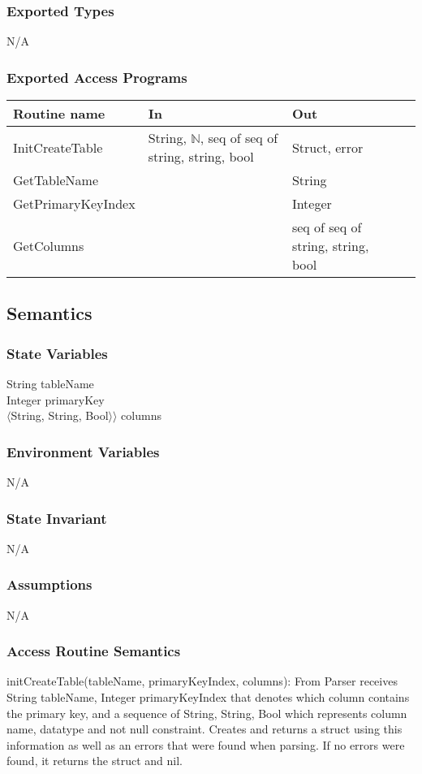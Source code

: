 \documentclass[12pt]{article}
\begin{document}
\subsubsection{Exported Types}
N/A
\subsubsection{Exported Access Programs}
\begin{tabular}{| l | l | l | l |}
\hline
\textbf{Routine name} & \textbf{In} & \textbf{Out}\\
\hline
InitCreateTable & String, $\mathbb{N}$, seq of seq of string, string, bool & Struct, error \\
\hline
GetTableName & & String \\
\hline
GetPrimaryKeyIndex & & Integer \\
\hline
GetColumns & & seq of seq of string, string, bool \\
\hline
\end{tabular}

\subsection{Semantics}
\subsubsection{State Variables}
String tableName \\
Integer primaryKey \\
$\langle$String, String, Bool$\rangle \rangle$ columns\\

\subsubsection{Environment Variables}
N/A

\subsubsection{State Invariant}
N/A

\subsubsection{Assumptions}
N/A

\subsubsection{Access Routine Semantics}
\noindent initCreateTable(tableName, primaryKeyIndex, columns): From Parser receives String tableName, Integer primaryKeyIndex that denotes which column contains the primary key, and a sequence of String, String, Bool which represents column name, datatype and not null constraint. Creates and returns a struct using this information as well as an errors that were found when parsing. If no errors were found, it returns the struct and nil. \\
\end{document}
